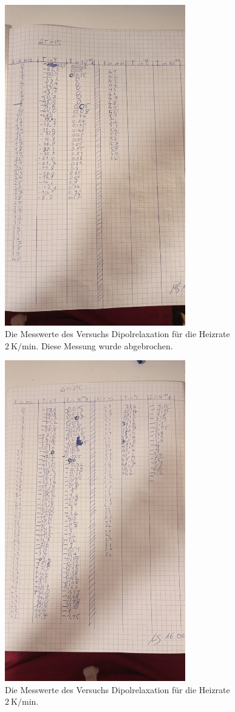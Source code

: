 \begin{figure}[h]
    \centering
    \includegraphics[width=0.7\textwidth]{latex/images/Messwerte_2.jpeg}
    \caption{Die Messwerte des Versuchs Dipolrelaxation für die Heizrate $\SI{2}{\kelvin\per\minute}$.
    Diese Messung wurde abgebrochen.}
\end{figure}

\begin{figure}[h]
    \centering
    \includegraphics[width=0.7\textwidth]{latex/images/Messwerte_3.jpeg}
    \caption{Die Messwerte des Versuchs Dipolrelaxation für die Heizrate $\SI{2}{\kelvin\per\minute}$.}
\end{figure}
